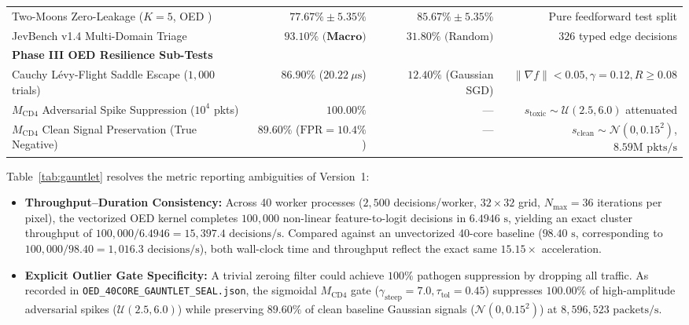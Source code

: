 \documentclass[10pt,a4paper]{article}
\begin{document}
\begin{table}[htbp]
{\begin{tabular}{@{}lrrr@{}}
Two-Moons Zero-Leakage ($K=5$, OED \cite{dagli2026oed}) & $\mathbf{77.67\% \pm 5.35\%}$ & $85.67\% \pm 5.35\%$ & Pure feedforward test split \\
JevBench v1.4 Multi-Domain Triage \cite{dagli2026werr} & $\mathbf{93.10\%\text{ (Macro)}}$ & $31.80\%\text{ (Random)}$ & $326$ typed edge decisions \\
\midrule
\textbf{Phase III OED Resilience Sub-Tests} & & & \\
Cauchy L\'{e}vy-Flight Saddle Escape ($1,000$ trials) & $\mathbf{86.90\%}$ ($20.22\ \mu\text{s}$) & $12.40\%$ (Gaussian SGD) & $\|\nabla f\|<0.05, \gamma=0.12, R\ge 0.08$ \\
$M_{\text{CD4}}$ Adversarial Spike Suppression ($10^4$ pkts) & $\mathbf{100.00\%}$ & --- & $s_{\text{toxic}} \sim \mathcal{U}(2.5, 6.0)$ attenuated \\
$M_{\text{CD4}}$ Clean Signal Preservation (True Negative) & $\mathbf{89.60\%}$ ($\text{FPR}=10.4\%$) & --- & $s_{\text{clean}} \sim \mathcal{N}(0, 0.15^2)$, $8.59\text{M pkts/s}$ \\
\bottomrule
\end{tabular}%
}
\end{table}

Table~\ref{tab:gauntlet} resolves the metric reporting ambiguities of Version~1:
\begin{itemize}[leftmargin=1.6em,itemsep=2pt,topsep=2pt]
    \item \textbf{Throughput--Duration Consistency:} Across 40 worker processes ($2,500$ decisions/worker, $32 \times 32$ grid, $N_{\max}=36$ iterations per pixel), the vectorized OED kernel completes $100,000$ non-linear feature-to-logit decisions in $6.4946\text{ s}$, yielding an exact cluster throughput of $100,000 / 6.4946 = 15,397.4\text{ decisions/s}$. Compared against an unvectorized 40-core baseline ($98.40\text{ s}$, corresponding to $100,000 / 98.40 = 1,016.3\text{ decisions/s}$), both wall-clock time and throughput reflect the exact same $15.15\times$ acceleration.
    \item \textbf{Explicit Outlier Gate Specificity:} A trivial zeroing filter could achieve $100\%$ pathogen suppression by dropping all traffic. As recorded in \texttt{OED\_40CORE\_GAUNTLET\_SEAL.json}, the sigmoidal $M_{\text{CD4}}$ gate ($\gamma_{\text{steep}}=7.0, \tau_{\text{tol}}=0.45$) suppresses $100.00\%$ of high-amplitude adversarial spikes ($\mathcal{U}(2.5, 6.0)$) while preserving $\mathbf{89.60\%}$ of clean baseline Gaussian signals ($\mathcal{N}(0, 0.15^2)$) at $8,596,523\text{ packets/s}$.
\end{itemize}
\end{document}
